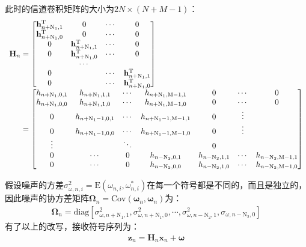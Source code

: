 此时的信道卷积矩阵的大小为$2N\times(N+M-1)$：
\begin{eqnarray}
    \begin{array}{l@{\;=\;}l}
        \mathbf{H}_n&
        \begin{bmatrix}
            \mathbf{h}_{n+\mathrm{N}_1,1}^{\mathrm{T}}&0&\cdots&0\\
            \mathbf{h}_{n+\mathrm{N}_1,0}^{\mathrm{T}}&0&\cdots&0\\
            0&\mathbf{h}_{n+\mathrm{N}_1,1}^{\mathrm{T}}&\cdots&0\\
            0&\mathbf{h}_{n+\mathrm{N}_1,0}^{\mathrm{T}}&\cdots&0\\
           &\cdots&&\\ 
            0&&\cdots&\mathbf{h}_{n+\mathrm{N}_1,1}^{\mathrm{T}}\\
            0&\qquad&\cdots&\mathbf{h}_{n+\mathrm{N}_1,0}^{\mathrm{T}}\\
        \end{bmatrix}\\
        &\begin{bmatrix}
            h_{n+\mathrm{N}_1,0,1}&h_{n+\mathrm{N}_1,1,1}&\cdots&h_{n+\mathrm{N}_1,\mathrm{M}-1,1}&0&\cdots&0\\
            h_{n+\mathrm{N}_1,0,0}&h_{n+\mathrm{N}_1,1,0}&\cdots&h_{n+\mathrm{N}_1,\mathrm{M}-1,0}&0&\cdots&0\\
            0&h_{n+\mathrm{N}_1-1,0,1}&\cdots&h_{n+\mathrm{N}_1-1,\mathrm{M}-1,1}&0&\vdots\\
            0&h_{n+\mathrm{N}_1-1,0,0}&\cdots&h_{n+\mathrm{N}_1-1,\mathrm{M}-1,0}&0&\vdots\\
            \vdots&&\ddots&&0\\
            0&\cdots&0&h_{n-\mathrm{N}_2,0,1}&h_{n-\mathrm{N}_2,1,1}&\cdots&h_{n-\mathrm{N}_2,\mathrm{M}-1,1}\\
            0&\cdots&0&h_{n-\mathrm{N}_2,0,0}&h_{n-\mathrm{N}_2,1,0}&\cdots&h_{n-\mathrm{N}_2,\mathrm{M}-1,0}\\
        \end{bmatrix}
    \end{array}
    \label{equ:3.40}
\end{eqnarray}

假设噪声的方差$\sigma_{\omega,n,i}^2=\mathrm{E}(\omega_{n,i},\omega_{n,i}^*)$在每一个符号都是不同的，而且是独立的，因此噪声的协方差矩阵$\boldsymbol{\Omega}_n=\mathrm{Cov}(\boldsymbol{\omega}_n,\boldsymbol{\omega}_n)$为：
\begin{eqnarray}
    \boldsymbol{\Omega}_n=\mathrm{diag}[\sigma_{\omega,n+\mathrm{N}_1,1}^2,\sigma_{\omega,n+\mathrm{N}_1,0}^2,\cdots,\sigma_{\omega,n-\mathrm{N}_2,1}^2,\sigma_{\omega,n-\mathrm{N}_2,0}]
    \label{equ:3.41}
\end{eqnarray}
有了以上的改写，接收符号序列为：
\begin{eqnarray}
    \mathbf{z}_n=\mathbf{H}_n\mathbf{x}_n+\boldsymbol{\omega}
    \label{equ:3.42}
\end{eqnarray}

